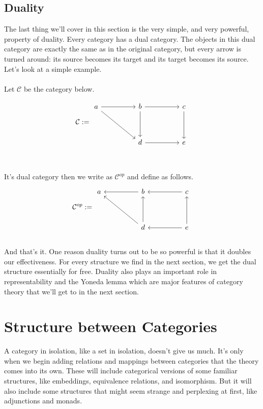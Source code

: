 \documentclass[12pt]{article}
\newcounter{examp}
\begin{document}
\subsection*{Duality}
The last thing we'll cover in this section is the very simple, and very powerful, property of duality.
Every category has a dual category.
The objects in this dual category are exactly the same as in the original category, but every arrow is turned around: its source becomes its target and its target becomes its source.
Let's look at a simple example.\\\\
Let $\mathcal{C}$ be the category below.

\[\mathcal{C} := \begin{tikzcd}
        a && b && c \\
        \\
        && d && e
        \arrow[from=1-1, to=1-3]
        \arrow[from=1-1, to=3-3]
        \arrow[from=1-3, to=3-3]
        \arrow[from=3-3, to=3-5]
        \arrow[from=1-3, to=1-5]
        \arrow[from=1-5, to=3-5]
    \end{tikzcd}\]
\\\\It's dual category then we write as $\mathcal{C}^{op}$ and define as follows.
\[\mathcal{C}^{op} := \begin{tikzcd}
        a && b && c \\
        \\
        && d && e
        \arrow[from=1-3, to=1-1]
        \arrow[from=3-3, to=1-1]
        \arrow[from=3-3, to=1-3]
        \arrow[from=3-5, to=3-3]
        \arrow[from=1-5, to=1-3]
        \arrow[from=3-5, to=1-5]
    \end{tikzcd}\]
\\
And that's it.
One reason duality turns out to be so powerful is that it doubles our effectiveness.
For every structure we find in the next section, we get the dual structure essentially for free.
Duality also plays an important role in representability and the Yoneda lemma which are major features of category theory that we'll get to in the next section.








\section*{Structure between Categories}
A category in isolation, like a set in isolation, doesn't give us much.
It's only when we begin adding relations and mappings between categories that the theory comes into its own.
These will include categorical versions of some familiar structures, like embeddings, equivalence relations, and isomorphism.
But it will also include some structures that might seem strange and perplexing at first, like adjunctions and monads.
\end{document}
